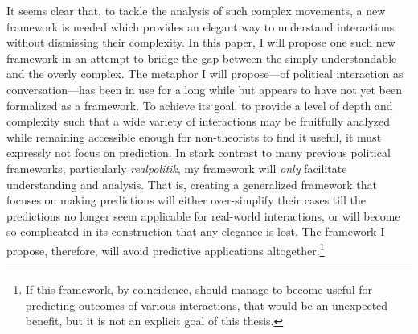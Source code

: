 \documentclass[openany,twoside]{memoir}
\begin{document}
\begin{Spacing}{2}
It seems clear that, to tackle the analysis of such complex movements, a new framework is needed which provides an elegant way to understand interactions without dismissing their complexity.
In this paper, I will propose one such new framework in an attempt to bridge the gap between the simply understandable and the overly complex.
The metaphor I will propose---of political interaction as conversation---has been in use for a long while but appears to have not yet been formalized as a framework.
To achieve its goal, to provide a level of depth and complexity such that a wide variety of interactions may be fruitfully analyzed while remaining accessible enough for non-theorists to find it useful, it must expressly not focus on prediction.
In stark contrast to many previous political frameworks, particularly \emph{realpolitik}, my framework will \emph{only} facilitate understanding and analysis.
That is, creating a generalized framework that focuses on making predictions will either over-simplify their cases till the predictions no longer seem applicable for real-world interactions, or will become so complicated in its construction that any elegance is lost.
The framework I propose, therefore, will avoid predictive applications altogether.\footnote{
If this framework, by coincidence, should manage to become useful for predicting outcomes of various interactions, that would be an unexpected benefit, but it is not an explicit goal of this thesis.}


\end{Spacing}
\end{document}
